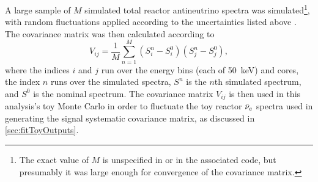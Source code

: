 \documentclass[../thesis.tex]{subfiles}
\begin{document}
A large sample of $M$ simulated total reactor antineutrino spectra was simulated\footnote{The exact value of $M$ is unspecified in \cite{Lewis} or in the associated code, but presumably it was large enough for convergence of the covariance matrix.}, with random fluctuations applied according to the uncertainties listed above \cite{Lewis}. The covariance matrix was then calculated according to
\begin{equation}
  V_{ij} = \frac{1}{M} \sum_{n=1}^M(S^n_{i} - S^0_{i})(S^n_{j} - S^0_{j}),
\end{equation}
where the indices $i$ and $j$ run over the energy bins (each of 50~keV) and cores, the index $n$ runs over the simulated spectra, $S^n$ is the $n$th simulated spectrum, and $S^0$ is the nominal spectrum. The covariance matrix $V_{ij}$ is then used in this analysis's toy Monte Carlo in order to fluctuate the toy reactor $\bar\nu_e$ spectra used in generating the signal systematic covariance matrix, as discussed in \autoref{sec:fitToyOutputs}.
\end{document}
